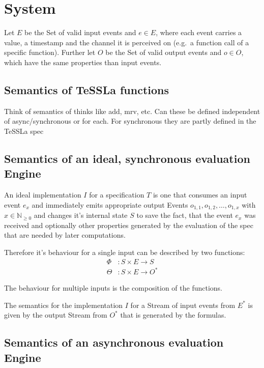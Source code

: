 %
\chapter{System}
\label{sec:system}

Let $E$ be the Set of valid input events and $e \in E$, where each event carries a value, a timestamp and the
channel it is perceived on (e.g.\ a function call of a specific function).
Further let $O$ be the Set of valid output events and $o \in O$, which have the same properties than input events.

\section{Semantics of TeSSLa functions}
Think of semantics of thinks like add, mrv, etc.
Can these be defined independent of async/synchronous or for each.
For synchronous they are partly defined in the TeSSLa spec

\section{Semantics of an ideal, synchronous evaluation Engine}
\label{sec:system:semantics_ideal}
An ideal implementation $I$ for a specification $T$ is one that consumes an input event $e_x$ and immediately emits
appropriate output Events $o_{1,1}, o_{1,2}, \dots , o_{1,x}$ with $x \in \mathbb{N}_{\ge0}$ and changes it's internal
state $S$ to save the fact, that the event $e_x$ was received and optionally other properties generated by the
evaluation of the spec that are needed by later computations.

Therefore it's behaviour for a single input can be described by two functions:
\begin{align*}
    \Phi&: S \times E \rightarrow S \\
    \Theta&: S \times E \rightarrow O^*
\end{align*}

The behaviour for multiple inputs is the composition of the functions.

The semantics for the implementation $I$ for a Stream of input events from $E^*$ is given by the output Stream
from $O^*$ that is generated by the formulas.

\section{Semantics of an asynchronous evaluation Engine}
\label{sec:system:semantics_async}


